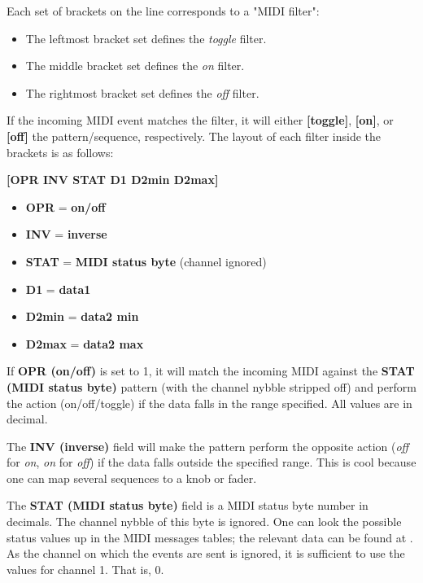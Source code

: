    Each set of brackets on the line corresponds to a "MIDI filter":

   \begin{itemize}
      \item The leftmost bracket set defines the \textsl{toggle} filter.
      \item The middle bracket set defines the \textsl{on} filter.
      \item The rightmost bracket set defines the \textsl{off} filter.
   \end{itemize}

   If the incoming MIDI event matches the filter, it will either
   \textbf{[toggle]}, \textbf{[on]}, or \textbf{[off]}
   the pattern/sequence, respectively.
   The layout of each filter inside the brackets is as follows:

      \textbf{[OPR INV STAT D1 D2min D2max]}

   \begin{itemize}
      \item \textbf{OPR} = \textbf{on/off}
      \item \textbf{INV} = \textbf{inverse}
      \item \textbf{STAT} = \textbf{MIDI status byte} (channel ignored) 
      \item \textbf{D1} = \textbf{data1}
      \item \textbf{D2min} = \textbf{data2 min}
      \item \textbf{D2max} = \textbf{data2 max}
   \end{itemize}

   If \textbf{OPR (on/off)} is set to 1, it will match the incoming MIDI
   against the \textbf{STAT (MIDI status byte)} pattern (with the channel
   nybble stripped off) and perform the action (on/off/toggle) if the data
   falls in the range specified.  All values are in decimal.

   The \textbf{INV (inverse)} field will make the pattern perform the opposite
   action (\textsl{off} for \textsl{on}, \textsl{on} for \textsl{off}) if the
   data falls outside the specified range.  This is cool because one can map
   several sequences to a knob or fader.

   The \textbf{STAT (MIDI status byte)} field is a MIDI status byte number in
   decimals.  The channel nybble of this byte is ignored.  One can look the
   possible status values up in the MIDI messages tables; the relevant data can
   be found at \cite{midicontroltable}.  As the channel on which the events are
   sent is ignored, it is sufficient to use the values for channel 1.  That is,
   0.

